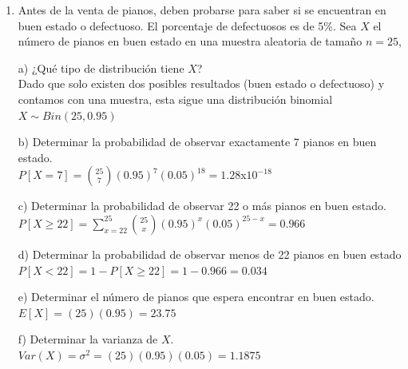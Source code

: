 \documentclass[a4paper, 12pt]{article}
\newcommand{\Aspace}{0.2cm}
\begin{document}
    \begin{enumerate}
        \item Antes de la venta de pianos, deben probarse para saber si se encuentran en buen estado o defectuoso. El porcentaje de defectuosos es de 5\%. Sea $X$ el número de pianos en buen estado en una muestra aleatoria de tamaño $n = 25$,
            \vspace{\Aspace} \par
            a) ¿Qué tipo de distribución tiene $X$?
            \\ { \color{azul} Dado que solo existen dos posibles resultados (buen estado o defectuoso) y contamos con una muestra, esta sigue una distribución binomial $X \sim Bin(25, 0{.}95)$ }

            \vspace{\Aspace} \par
            b) Determinar la probabilidad de observar exactamente 7 pianos en buen estado.
            \\ { \color{azul} $P[X = 7] = \binom{25}{7} (0{.}95)^{7} (0{.}05)^{18} = 1{.}28$x$10^{-18}$ }

            \vspace{\Aspace} \par
            c) Determinar la probabilidad de observar 22 o más pianos en buen estado.
            \\ { \color{azul} $P[X \geq 22] = \sum\limits_{x = 22}^{25} \binom{25}{x} (0{.}95)^{x} (0{.}05)^{25 - x} = 0{.}966$ }

            \vspace{\Aspace} \par
            d) Determinar la probabilidad de observar menos de 22 pianos en buen estado
            \\ { \color{azul} $P[X < 22] = 1 - P[X \geq 22] = 1 - 0{.}966 = 0{.}034$ }

            \vspace{\Aspace} \par
            e) Determinar el número de pianos que espera encontrar en buen estado.
            \\ { \color{azul} $E[X] = (25)(0{.}95) = 23{.}75$ }

            \vspace{\Aspace} \par
            f) Determinar la varianza de $X$.
            \\ { \color{azul} $Var(X) = \sigma^{2} = (25)(0{.}95)(0{.}05) = 1{.}1875$ }



\end{enumerate}
\end{document}
